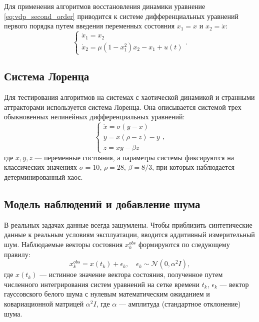 Для применения алгоритмов восстановления динамики уравнение \ref{eq:vdp_second_order} приводится к системе дифференциальных уравнений первого порядка путем введения переменных состояния $x_1 = x$ и $x_2 = \dot{x}$:
\begin{equation}
\label{eq:vdp_state_space}
\begin{cases}
\dot{x}_1 = x_2 \\
\dot{x}_2 = \mu(1-x_1^2)x_2 - x_1 + u(t)
\end{cases}.
\end{equation}

\subsection{Система Лоренца}

Для тестирования алгоритмов на системах с хаотической динамикой и странными аттракторами используется система Лоренца. Она описывается системой трех обыкновенных нелинейных дифференциальных уравнений:
\begin{equation}
\label{eq:lorenz}
\begin{cases}
\dot{x} = \sigma(y - x) \\
\dot{y} = x(\rho - z) - y \\
\dot{z} = xy - \beta z
\end{cases},
\end{equation}
где $x, y, z$ --- переменные состояния, а параметры системы фиксируются на классических значениях $\sigma = 10$, $\rho = 28$, $\beta = 8/3$, при которых наблюдается детерминированный хаос.

\subsection{Модель наблюдений и добавление шума}

В реальных задачах данные всегда зашумлены. Чтобы приблизить синтетические данные к реальным условиям эксплуатации, вводится аддитивный измерительный шум. Наблюдаемые векторы состояния $x^{obs}_k$ формируются по следующему правилу:
\begin{equation}
\label{eq:noise_model}
x^{obs}_k = x(t_k) + \epsilon_k, \quad \epsilon_k \sim \mathcal{N}(0, \alpha^2 I),
\end{equation}
где $x(t_k)$ --- истинное значение вектора состояния, полученное путем численного интегрирования систем уравнений на сетке времени $t_k$, $\epsilon_k$ --- вектор гауссовского белого шума с нулевым математическим ожиданием и ковариационной матрицей $\alpha^2 I$, где $\alpha$ --- амплитуда (стандартное отклонение) шума.